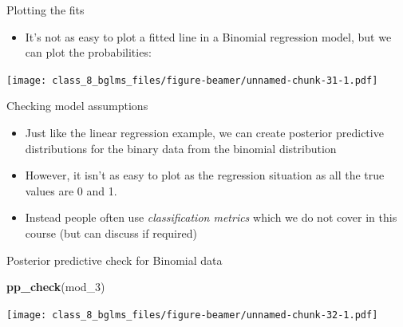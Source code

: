 \documentclass[ignorenonframetext,]{beamer}
\newenvironment{Shaded}{\begin{snugshade}}{\end{snugshade}}
\newcommand{\KeywordTok}[1]{\textcolor[rgb]{0.13,0.29,0.53}{\textbf{#1}}}
\newcommand{\DataTypeTok}[1]{\textcolor[rgb]{0.13,0.29,0.53}{#1}}
\newcommand{\DecValTok}[1]{\textcolor[rgb]{0.00,0.00,0.81}{#1}}
\newcommand{\StringTok}[1]{\textcolor[rgb]{0.31,0.60,0.02}{#1}}
\newcommand{\OperatorTok}[1]{\textcolor[rgb]{0.81,0.36,0.00}{\textbf{#1}}}
\newcommand{\NormalTok}[1]{#1}
\providecommand{\tightlist}{%
  \setlength{\itemsep}{0pt}\setlength{\parskip}{0pt}}
\begin{document}
\begin{frame}[fragile]{Plotting the fits}

\begin{itemize}
\tightlist
\item
  It's not as easy to plot a fitted line in a Binomial regression model,
  but we can plot the probabilities: \small
\end{itemize}

\begin{Shaded}
\end{Shaded}

\texttt{[image: class\_8\_bglms\_files/figure-beamer/unnamed-chunk-31-1.pdf]}

\end{frame}

\begin{frame}{Checking model assumptions}

\begin{itemize}
\tightlist
\item
  Just like the linear regression example, we can create posterior
  predictive distributions for the binary data from the binomial
  distribution
\item
  However, it isn't as easy to plot as the regression situation as all
  the true values are 0 and 1.
\item
  Instead people often use \emph{classification metrics} which we do not
  cover in this course (but can discuss if required)
\end{itemize}

\end{frame}

\begin{frame}[fragile]{Posterior predictive check for Binomial data}

\begin{Shaded}
\begin{Highlighting}[]
\KeywordTok{pp_check}\NormalTok{(mod_}\DecValTok{3}\NormalTok{)}
\end{Highlighting}
\end{Shaded}

\texttt{[image: class\_8\_bglms\_files/figure-beamer/unnamed-chunk-32-1.pdf]}

\end{frame}
\end{document}
